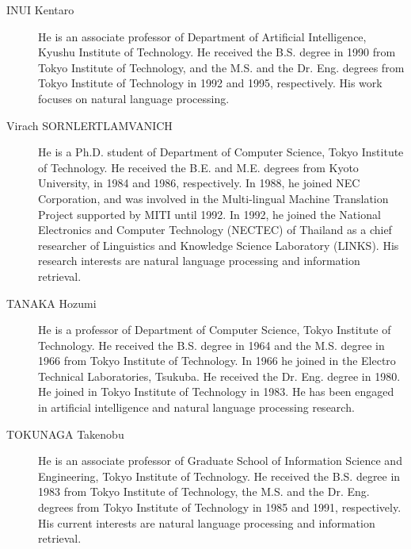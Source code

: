 \documentclass[a4j]{article}
\begin{document}
\begin{description}
\item[INUI Kentaro]
  He is an associate professor of Department of Artificial Intelligence,
  Kyushu Institute of Technology. He received the B.S. degree in 1990
  from Tokyo Institute of Technology, and the M.S. and the
  Dr. Eng. degrees from Tokyo Institute of Technology in 1992 and 1995,
  respectively. His work focuses on natural language processing.
\item[Virach SORNLERTLAMVANICH]
  He is a Ph.D. student of Department of Computer Science, Tokyo
  Institute of Technology. He received the B.E. and M.E. degrees from
  Kyoto University, in 1984 and 1986, respectively. In 1988, he joined
  NEC Corporation, and was involved in the Multi-lingual Machine
  Translation Project supported by MITI until 1992. In 1992, he joined
  the National Electronics and Computer Technology (NECTEC) of Thailand
  as a chief researcher of Linguistics and Knowledge Science Laboratory
  (LINKS). His research interests are natural language processing and
  information retrieval.
\item[TANAKA Hozumi]
  He is a professor of Department of Computer Science, Tokyo Institute
  of Technology. He received the B.S. degree in 1964 and the M.S. degree
  in 1966 from Tokyo Institute of Technology. In 1966 he joined in the
  Electro Technical Laboratories, Tsukuba. He received the
  Dr. Eng. degree in 1980. He joined in Tokyo Institute of Technology in
  1983. He has been engaged in artificial intelligence and natural
  language processing research.
\item[TOKUNAGA Takenobu]
  He is an associate professor of Graduate School of Information Science
  and Engineering, Tokyo Institute of Technology. He received the B.S.
  degree in 1983 from Tokyo Institute of Technology, the M.S. and the
  Dr. Eng. degrees from Tokyo Institute of Technology in 1985 and 1991,
  respectively. His current interests are natural language processing
  and information retrieval.
\end{description}
\end{document}
